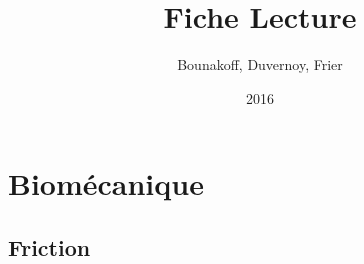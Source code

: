 \documentclass{report}
\title{Fiche Lecture}
\author{Bounakoff, Duvernoy, Frier}
\date{2016}
\begin{document}
	\maketitle
	\tableofcontents
	
	\part{Biom\'{e}canique}
		\chapter{Friction}
			
	
\end{document}
